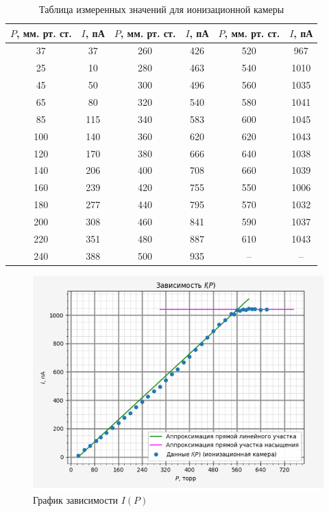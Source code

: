 \documentclass[a4paper, 12pt]{article}%
\begin{document}
    \begin{table}[h!]
        \centering
        \begin{tabular}{|c|c|c|c|c|c|}
        \hline
        $P$, мм. рт. ст. & $I$, пА & $P$, мм. рт. ст. & $I$, пА & $P$, мм. рт. ст. & $I$, пА \\ \hline
        37        & 37      & 260       & 426     & 520       & 967     \\ \hline
        25        & 10      & 280       & 463     & 540       & 1010    \\ \hline
        45        & 50      & 300       & 496     & 560       & 1035    \\ \hline
        65        & 80      & 320       & 540     & 580       & 1041    \\ \hline
        85        & 115     & 340       & 583     & 600       & 1045    \\ \hline
        100       & 140     & 360       & 620     & 620       & 1043    \\ \hline
        120       & 170     & 380       & 666     & 640       & 1038    \\ \hline
        140       & 206     & 400       & 708     & 660       & 1039    \\ \hline
        160       & 239     & 420       & 755     & 550       & 1006    \\ \hline
        180       & 277     & 440       & 795     & 570       & 1032    \\ \hline
        200       & 308     & 460       & 841     & 590       & 1037    \\ \hline
        220       & 351     & 480       & 887     & 610       & 1043    \\ \hline
        240       & 388     & 500       & 935     & --        & --      \\ \hline
        \end{tabular}
        \caption{Таблица измеренных значений для ионизационной камеры}
    \end{table}
    
    \begin{figure}[!h]
        \centering
        \includegraphics[width = 14 cm]{method3.png}
        \caption{График зависимости $I(P)$}
        \label{}
    \end{figure}
\end{document}
